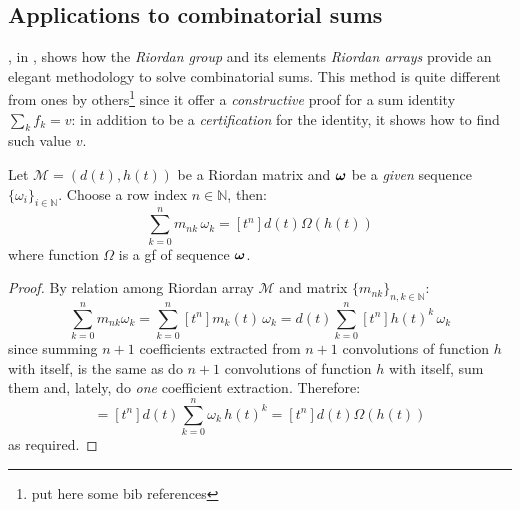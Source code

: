

\subsection{Applications to combinatorial sums}

\citeauthor{sprugnoli:1991}, in \cite{sprugnoli:1991}, shows how the
\emph{Riordan group} and its elements \emph{Riordan arrays} provide an elegant
methodology to solve combinatorial sums. This method is quite different from
ones by others\footnote{put here some bib references} since it offer a
\emph{constructive} proof for a sum identity $\sum_{k}f_{k}=v$: in addition to
be a \emph{certification} for the identity, it shows how to find such value
$v$. 

\begin{theorem}[Sprugnoli]
    Let $\mathcal{M}=(d(t),h(t))$ be a Riordan matrix and $\boldsymbol{\omega}$ 
    be a \emph{given} sequence $\lbrace\omega_{i}\rbrace_{i\in\mathbb{N}}$. Choose
    a row index $n\in\mathbb{N}$, then:
    \begin{displaymath}
        \sum_{k=0}^{n}{m_{nk}\,\omega_{k}}=[t^{n}]d(t)\Omega(h(t))
    \end{displaymath}
    where function $\Omega$ is a \ac{gf} of sequence $\boldsymbol{\omega}$.
    \label{thm:sprugnoli:riordan:combinatorial:sums}
\end{theorem}

\begin{proof}
    By relation among Riordan array $\mathcal{M}$ and matrix 
    $\lbrace m_{nk}\rbrace_{n,k\in\mathbb{N}}$:
    \begin{displaymath}
        \sum_{k=0}^{n}{m_{nk}\omega_{k}}
            =\sum_{k=0}^{n}{[t^{n}]m_{k}(t)\,\omega_{k}}
            =d(t)\sum_{k=0}^{n}{[t^{n}]h(t)^{k}\,\omega_{k}}
    \end{displaymath}
    since summing $n+1$ coefficients extracted from $n+1$
    convolutions of function $h$ with itself, is the same as
    do $n+1$ convolutions of function $h$ with itself, sum them
    and, lately, do \emph{one} coefficient extraction. Therefore:
    \begin{displaymath}
        =[t^{n}]d(t)\sum_{k=0}^{n}{\omega_{k}\,h(t)^{k}}
        =[t^{n}]d(t)\Omega(h(t))
    \end{displaymath}
    as required.
\end{proof}

